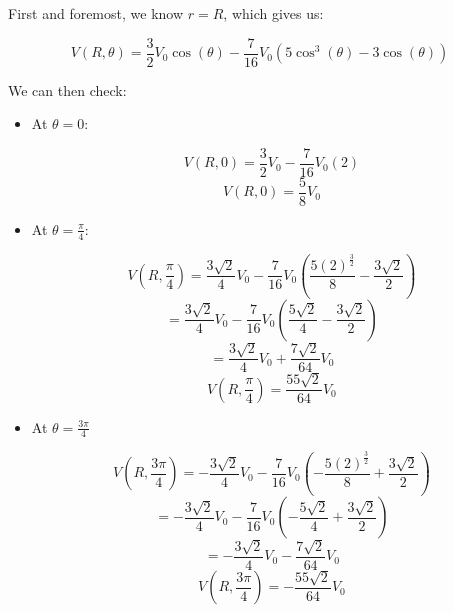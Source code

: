\begin{enumerate}
\begin{enumerate}
        First and foremost, we know $r=R$, which gives us:

        $$V(R,\theta)=\frac{3}{2}V_0\cos(\theta)-\frac{7}{16}V_0\left( 5\cos^3(\theta)-3\cos(\theta) \right)$$

        We can then check:

        \begin{itemize}

          \item At $\theta=0$:

            $$V(R,0)=\frac{3}{2}V_0-\frac{7}{16}V_0(2)$$
            $$\boxed{V(R,0)=\frac{5}{8}V_0}$$

          \item At $\theta=\frac{\pi}{4}$:

            $$V\left( R,\frac{\pi}{4} \right)=\frac{3\sqrt{2}}{4}V_0-\frac{7}{16}V_0\left( \frac{5(2)^{\frac{3}{2}}}{8}-\frac{3\sqrt{2}}{2} \right)$$
            $$=\frac{3\sqrt{2}}{4}V_0-\frac{7}{16}V_0\left( \frac{5\sqrt{2}}{4}-\frac{3\sqrt{2}}{2} \right)$$
            $$=\frac{3\sqrt{2}}{4}V_0+\frac{7\sqrt{2}}{64}V_0$$
            $$\boxed{V\left( R,\frac{\pi}{4} \right)=\frac{55\sqrt{2}}{64}V_0}$$

          \item At $\theta=\frac{3\pi}{4}$

            $$V\left( R,\frac{3\pi}{4} \right)=-\frac{3\sqrt{2}}{4}V_0-\frac{7}{16}V_0\left( -\frac{5(2)^{\frac{3}{2}}}{8}+\frac{3\sqrt{2}}{2} \right)$$
            $$=-\frac{3\sqrt{2}}{4}V_0-\frac{7}{16}V_0\left( -\frac{5\sqrt{2}}{4}+\frac{3\sqrt{2}}{2} \right)$$
            $$=-\frac{3\sqrt{2}}{4}V_0-\frac{7\sqrt{2}}{64}V_0$$
            $$\boxed{V\left( R,\frac{3\pi}{4} \right)=-\frac{55\sqrt{2}}{64}V_0}$$

        \end{itemize}

    \end{enumerate}

\end{enumerate}




